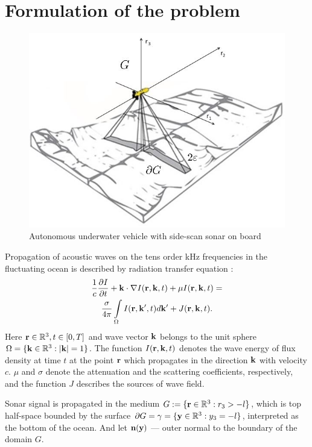 \documentclass{procDDs}
\begin{document}
\section{Formulation of the problem}
\begin{figure}[h!]\center
	
	\includegraphics[width=1\linewidth]{gbo.jpg}
	\caption{Autonomous underwater vehicle with side-scan sonar on board}
	\label{ris:gbo}
\end{figure}
Propagation of acoustic waves on the tens order kHz frequencies in the fluctuating ocean is described by radiation
transfer equation \cite{AF2015, SPIE_KOV,SMJ2015, Prokh_Sush_Kim_2017}:
\begin{multline}
	\label{model}
	\frac{1}{c} \frac{\partial I}{\partial t} + \mathbf{k} \cdot \nabla I(\mathbf{r},\mathbf{k},t) + \mu I(\mathbf{r},\mathbf{k},t) = \\
	\frac{\sigma}{4 \pi} \int\limits_{\Omega} I(\mathbf{r},\mathbf{k}',t) d\mathbf{k}' + J(\mathbf{r},\mathbf{k},t).
\end{multline}
Here $\mathbf{r} \in \mathbb{R}^3, t \in [0, T]$ and wave vector $\mathbf{k}$ belongs to the unit sphere $\Omega = \{\mathbf{k} \in \mathbb{R}^3: |\mathbf{k}| = 1\}$. The function $I(\mathbf{r},\mathbf{k}, t)$ denotes the wave energy of flux density at time $t$  at the point $\mathbf{r}$ which propagates in the direction $\mathbf{k}$  with velocity $c$. $\mu$ and $\sigma$ denote the attenuation and the scattering coefficients, respectively, and the function $J$ describes the sources of wave field.

Sonar signal is propagated in the medium $G:=\{\mathbf{r} \in \mathbb{R}^3:r_3 > -l\}$, which is top half-space bounded by the surface $\partial G = \gamma = \{\mathbf{y} \in \mathbb{R}^3: y_3 = -l \}$, interpreted as the bottom of the ocean. And let $\textbf{n}(\mathbf{y})$ --- outer normal to the boundary of the domain $G$. 
\end{document}
